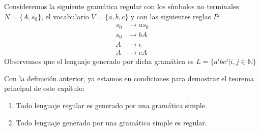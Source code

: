 \documentclass[../main.tex]{subfiles}
\begin{document}
 \begin{ej}
 	Consideremos la siguiente gramática regular con los símbolos no terminales $N= \{A, s_0\}$, el vocabulario $V=\{a, b, c\}$ y con las siguientes reglas $P$:
 	\begin{align*}
		s_0 &\to as_0 \\
		s_0 &\to bA \\
		A &\to \epsilon \\
		A &\to cA
 	\end{align*} 
 	Observemos que el lenguaje generado por dicha gramática es $L=\{ a^i b c^j|i, j \in \mathbb{N} \}$  
 \end{ej}
 
 Con la definición anterior, ya estamos en condiciones para demostrar el teorema principal de este capítulo:
 
 
 \begin{thm}
	\begin{enumerate}[label=(\alph*)]
 		\item Todo lenguaje regular es generado por una gramática simple.
 		\item Todo lenguaje generado por una gramática simple es regular.
 \end{enumerate}	

 \end{thm}
 
\end{document}
